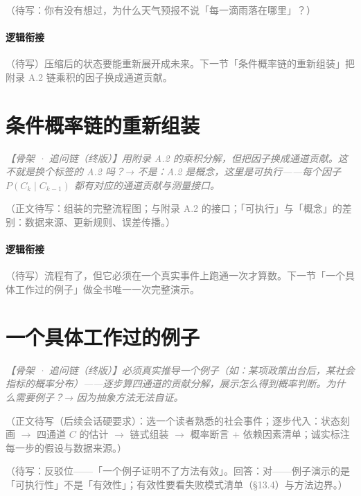 \documentclass[../../main2.tex]{subfiles}
\begin{document}
	\begin{readingnote}
		\textcolor{gray}{（待写：你有没有想过，为什么天气预报不说「每一滴雨落在哪里」？）}
	\end{readingnote}

	\paragraph*{逻辑衔接}
	\textcolor{gray}{（待写）压缩后的状态要能重新展开成未来。下一节「条件概率链的重新组装」把附录 A.2 链乘积的因子换成通道贡献。}

	\section{条件概率链的重新组装}
	\label{sec:fc-reassemble}

	\textcolor{gray}{\textit{【骨架 · 追问链（终版）】用附录 A.2 的乘积分解，但把因子换成通道贡献。这不就是换个标签的 A.2 吗？→ 不是：A.2 是概念，这里是可执行——每个因子 $P(C_k \mid C_{k-1})$ 都有对应的通道贡献与测量接口。}}

	\textcolor{gray}{（正文待写：组装的完整流程图；与附录 A.2 的接口；「可执行」与「概念」的差别：数据来源、更新规则、误差传播。）}

	\paragraph*{逻辑衔接}
	\textcolor{gray}{（待写）流程有了，但它必须在一个真实事件上跑通一次才算数。下一节「一个具体工作过的例子」做全书唯一一次完整演示。}

	\section{一个具体工作过的例子}
	\label{sec:fc-example}

	\textcolor{gray}{\textit{【骨架 · 追问链（终版）】必须真实推导一个例子（如：某项政策出台后，某社会指标的概率分布）——逐步算四通道的贡献分解，展示怎么得到概率判断。为什么需要例子？→ 因为抽象方法无法自证。}}

	\textcolor{gray}{（正文待写（后续会话硬要求）：选一个读者熟悉的社会事件；逐步代入：状态刻画 $\to$ 四通道 $C$ 的估计 $\to$ 链式组装 $\to$ 概率断言 + 依赖因素清单；诚实标注每一步的假设与数据来源。）}

	\begin{questionbox}
		\textcolor{gray}{（待写：反驳位——「一个例子证明不了方法有效」。回答：对——例子演示的是「可执行性」不是「有效性」；有效性要看失败模式清单（§13.4）与方法边界。）}
	\end{questionbox}
\end{document}
